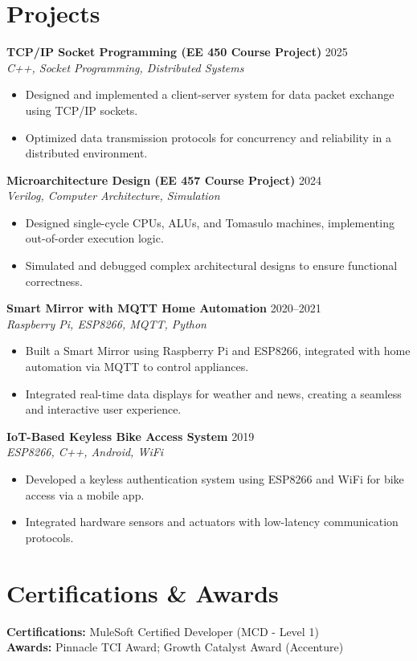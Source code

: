 \documentclass[letterpaper,10pt]{article}
\begin{document}
\section*{Projects}

\textbf{TCP/IP Socket Programming (EE 450 Course Project)} \hfill 2025 \\
\textit{C++, Socket Programming, Distributed Systems}
\begin{itemize}[leftmargin=*,noitemsep,topsep=-2pt]
    \item Designed and implemented a client-server system for data packet exchange using TCP/IP sockets.
    \item Optimized data transmission protocols for concurrency and reliability in a distributed environment.
\end{itemize}

\textbf{Microarchitecture Design (EE 457 Course Project)} \hfill 2024 \\
\textit{Verilog, Computer Architecture, Simulation}
\begin{itemize}[leftmargin=*,noitemsep,topsep=-2pt]
    \item Designed single-cycle CPUs, ALUs, and Tomasulo machines, implementing out-of-order execution logic.
    \item Simulated and debugged complex architectural designs to ensure functional correctness.
\end{itemize}

\textbf{Smart Mirror with MQTT Home Automation} \hfill 2020--2021 \\
\textit{Raspberry Pi, ESP8266, MQTT, Python}
\begin{itemize}[leftmargin=*,noitemsep,topsep=-2pt]
    \item Built a Smart Mirror using Raspberry Pi and ESP8266, integrated with home automation via MQTT to control appliances.
    \item Integrated real-time data displays for weather and news, creating a seamless and interactive user experience.
\end{itemize}

\textbf{IoT-Based Keyless Bike Access System} \hfill 2019 \\
\textit{ESP8266, C++, Android, WiFi}
\begin{itemize}[leftmargin=*,noitemsep,topsep=-2pt]
    \item Developed a keyless authentication system using ESP8266 and WiFi for bike access via a mobile app.
    \item Integrated hardware sensors and actuators with low-latency communication protocols.
\end{itemize}

\section*{Certifications \& Awards}
\textbf{Certifications:} MuleSoft Certified Developer (MCD - Level 1) \\
\textbf{Awards:} Pinnacle TCI Award; Growth Catalyst Award (Accenture)
\end{document}
